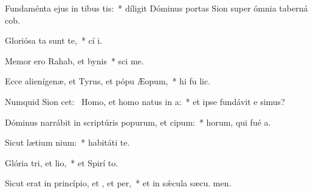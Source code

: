 \item Fundaménta ejus in tibus tis:~* díligit Dóminus portas Sion super ómnia taberná cob.
\item Gloriósa ta sunt  te,~* cí i.
\item Memor ero Rahab, et bynis~* sci me.
\item Ecce alienígenæ, et Tyrus, et pópu Æopum,~* hi fu lic.
\item Numquid Sion cet:~\pscross{} Homo, et homo natus  in a:~* et ipse fundávit e simus?
\item Dóminus narrábit in scriptúris popurum, et cipum:~* horum, qui fué  a.
\item Sicut lætium nium:~* habitáti   te.
\item Glória tri, et lio,~* et Spirí to.
\item Sicut erat in princípio, et , et per,~* et in sǽcula sæcu. men.
